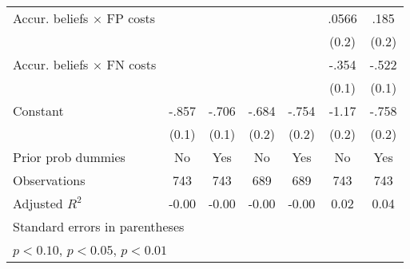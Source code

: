\begin{table}[htbp]
\begin{tabular}{l*{6}{c}}
Accur. beliefs $\times$ FP costs&                  &                  &                  &                  &    .0566         &     .185         \\
                &                  &                  &                  &                  &    (0.2)         &    (0.2)         \\
Accur. beliefs $\times$ FN costs&                  &                  &                  &                  &    -.354\sym{***}&    -.522\sym{***}\\
                &                  &                  &                  &                  &    (0.1)         &    (0.1)         \\
Constant        &    -.857\sym{***}&    -.706\sym{***}&    -.684\sym{***}&    -.754\sym{***}&    -1.17\sym{***}&    -.758\sym{***}\\
                &    (0.1)         &    (0.1)         &    (0.2)         &    (0.2)         &    (0.2)         &    (0.2)         \\
Prior prob dummies &       No         &      Yes         &       No         &      Yes         &       No         &      Yes         \\
\hline
Observations    &      743         &      743         &      689         &      689         &      743         &      743         \\
Adjusted \(R^{2}\)&    -0.00         &    -0.00         &    -0.00         &    -0.00         &     0.02         &     0.04         \\
\hline\hline
\multicolumn{7}{l}{\footnotesize Standard errors in parentheses}\\
\multicolumn{7}{l}{\footnotesize \sym{*} \(p<0.10\), \sym{**} \(p<0.05\), \sym{***} \(p<0.01\)}\\
\end{tabular}
\end{table}
